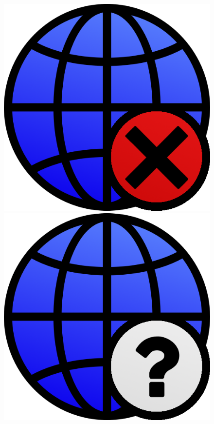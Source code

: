 \begin{figure}[H]
\begin{minipage}{0.2\textwidth}
	\end{minipage}
	\begin{minipage}{0.2\textwidth}
		\includegraphics[]{images/webifier-malicious}
	\end{minipage}
	\begin{minipage}{0.2\textwidth}
		\includegraphics[]{images/webifier-undefined}
	\end{minipage}
\end{figure}

